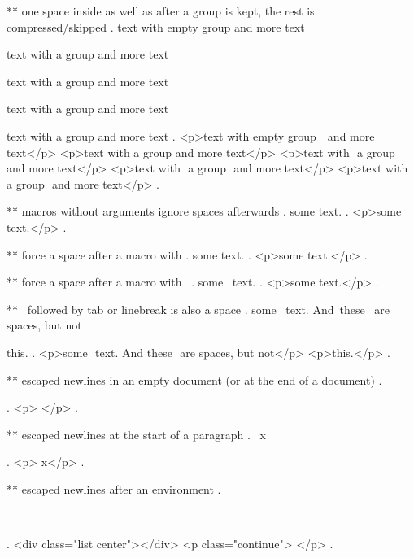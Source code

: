 ** one space inside as well as after a group is kept, the rest is compressed/skipped
.
text with empty group {  } and more text

text with {a group} and more text

text with { a group } and more text

text with { a group  } and more text

text with {  a group  }  and more text
.
<p>text with empty group ​ ​ and more text</p>
<p>text with a group​ and more text</p>
<p>text with ​ a group ​ and more text</p>
<p>text with ​ a group ​ and more text</p>
<p>text with ​ a group ​ and more text</p>
.


** macros without arguments ignore spaces afterwards
.
some \empty  text.
.
<p>some text.</p>
.


** force a space after a macro with {}
.
some \empty{} text.
.
<p>some ​ text.</p>
.


** force a space after a macro with \
.
some \empty\ text.
.
<p>some ​ text.</p>
.


** \ followed by tab or linebreak is also a space
.
some \empty\
text. And\	these
\
are spaces, but not\

this.
.
<p>some ​ text. And​ these ​ are spaces, but not​ </p>
<p>this.</p>
.


** escaped newlines in an empty document (or at the end of a document)
.
\


.
<p>​ </p>
.


** escaped newlines at the start of a paragraph
.
\
x

.
<p>​ x</p>
.


** escaped newlines after an environment
.
\begin{center}
\end{center}
\

.
<div class="list center"></div>
<p class="continue">​ </p>
.
